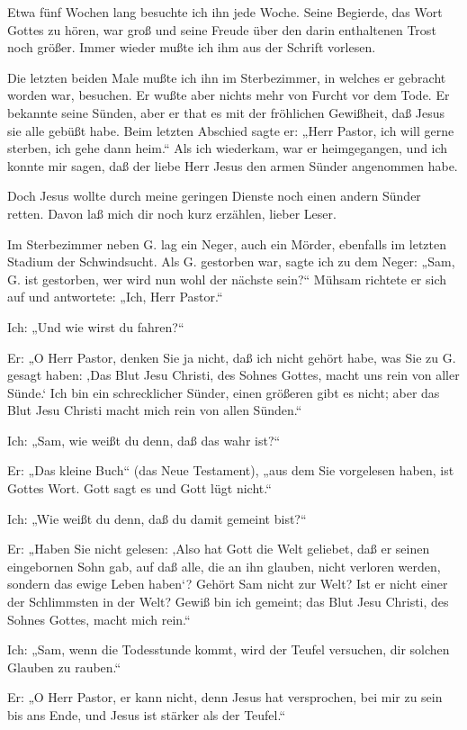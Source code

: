 Etwa fünf Wochen lang besuchte ich ihn jede Woche. Seine Begierde, das Wort Gottes zu hören, war groß und seine Freude über den darin enthaltenen Trost noch größer. Immer wieder mußte ich ihm aus der Schrift vorlesen.

Die letzten beiden Male mußte ich ihn im Sterbezimmer, in welches er gebracht worden war, besuchen. Er wußte aber nichts mehr von Furcht vor dem Tode. Er bekannte seine Sünden, aber er that es mit der fröhlichen Gewißheit, daß Jesus sie alle gebüßt habe. Beim letzten Abschied sagte er: „Herr Pastor, ich will gerne sterben, ich gehe dann heim.“ Als ich wiederkam, war er heimgegangen, und ich konnte mir sagen, daß der liebe Herr Jesus den armen Sünder angenommen habe.

Doch Jesus wollte durch meine geringen Dienste noch einen andern Sünder retten. Davon laß mich dir noch kurz erzählen, lieber Leser.

Im Sterbezimmer neben G. lag ein Neger, auch ein Mörder, ebenfalls im letzten Stadium der Schwindsucht. Als G. gestorben war, sagte ich zu dem Neger: „Sam, G. ist gestorben, wer wird nun wohl der nächste sein?“ Mühsam richtete er sich auf und antwortete: „Ich, Herr Pastor.“

Ich: „Und wie wirst du fahren?“

Er: „O Herr Pastor, denken Sie ja nicht, daß ich nicht gehört habe, was Sie zu G. gesagt haben: ‚Das Blut Jesu Christi, des Sohnes Gottes, macht uns rein von aller Sünde.‘ Ich bin ein schrecklicher Sünder, einen größeren gibt es nicht; aber das Blut Jesu Christi macht mich rein von allen Sünden.“

Ich: „Sam, wie weißt du denn, daß das wahr ist?“

Er: „Das kleine Buch“ (das Neue Testament), „aus dem Sie vorgelesen haben, ist Gottes Wort. Gott sagt es und Gott lügt nicht.“

Ich: „Wie weißt du denn, daß du damit gemeint bist?“

Er: „Haben Sie nicht gelesen: ‚Also hat Gott die Welt geliebet, daß er seinen eingebornen Sohn gab, auf daß alle, die an ihn glauben, nicht verloren werden, sondern das ewige Leben haben‘? Gehört Sam nicht zur Welt? Ist er nicht einer der Schlimmsten in der Welt? Gewiß bin ich gemeint; das Blut Jesu Christi, des Sohnes Gottes, macht mich rein.“

Ich: „Sam, wenn die Todesstunde kommt, wird der Teufel versuchen, dir solchen Glauben zu rauben.“

Er: „O Herr Pastor, er kann nicht, denn Jesus hat versprochen, bei mir zu sein bis ans Ende, und Jesus ist stärker als der Teufel.“

